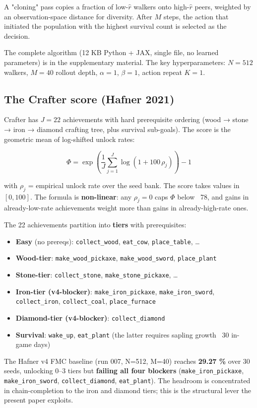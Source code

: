 \documentclass[11pt,letterpaper]{article}
\begin{document}
A "cloning" pass copies a fraction of low-$\widehat{r}$ walkers onto
high-$\widehat{r}$ peers, weighted by an observation-space distance for
diversity. After $M$ steps, the action that initiated the population
with the highest survival count is selected as the decision.

The complete algorithm (12 KB Python + JAX, single file, no learned
parameters) is in the supplementary material. The key
hyperparameters: $N = 512$ walkers, $M = 40$ rollout depth, $\alpha = 1$,
$\beta = 1$, action repeat $K = 1$.

\subsection{The Crafter score (Hafner 2021)}

Crafter has $J = 22$ achievements with hard prerequisite ordering
(wood → stone → iron → diamond crafting tree, plus survival sub-goals).
The score is the geometric mean of log-shifted unlock rates:

\[
\Phi = \exp\!\left( \frac{1}{J} \sum_{j=1}^{J} \log(1 + 100\, \rho_j) \right) - 1
\]

with $\rho_j$ = empirical unlock rate over the seed bank. The score
takes values in $[0, 100]$. The formula is \textbf{non-linear}: any
$\rho_j = 0$ caps $\Phi$ below ~78, and gains in already-low-rate
achievements weight more than gains in already-high-rate ones.

The 22 achievements partition into \textbf{tiers} with prerequisites:

\begin{itemize}
\item \textbf{Easy} (no prereqs): \texttt{collect\_wood}, \texttt{eat\_cow}, \texttt{place\_table}, …
\item \textbf{Wood-tier}: \texttt{make\_wood\_pickaxe}, \texttt{make\_wood\_sword}, \texttt{place\_plant}
\item \textbf{Stone-tier}: \texttt{collect\_stone}, \texttt{make\_stone\_pickaxe}, …
\item \textbf{Iron-tier (v4-blocker)}: \texttt{make\_iron\_pickaxe}, \texttt{make\_iron\_sword}, \texttt{collect\_iron}, \texttt{collect\_coal}, \texttt{place\_furnace}
\item \textbf{Diamond-tier (v4-blocker)}: \texttt{collect\_diamond}
\item \textbf{Survival}: \texttt{wake\_up}, \texttt{eat\_plant} (the latter requires sapling growth ~30 in-game days)
\end{itemize}
The Hafner v4 FMC baseline (run 007, N=512, M=40) reaches \textbf{29.27 \%}
over 30 seeds, unlocking 0–3 tiers but \textbf{failing all four blockers}
(\texttt{make\_iron\_pickaxe}, \texttt{make\_iron\_sword}, \texttt{collect\_diamond}, \texttt{eat\_plant}).
The headroom is concentrated in chain-completion to the iron and
diamond tiers; this is the structural lever the present paper exploits.
\end{document}
